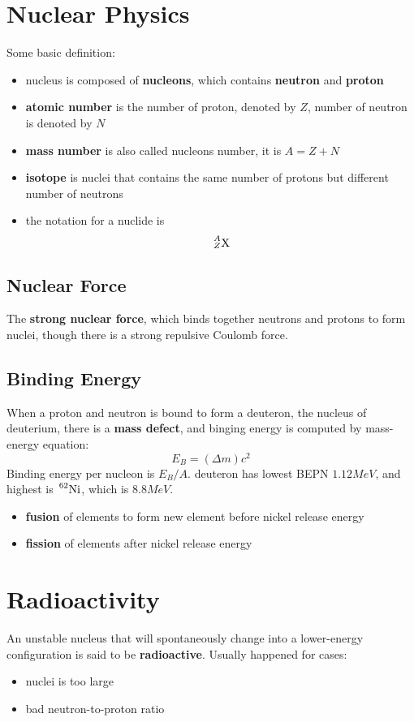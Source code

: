 \documentclass[10pt,a4paper,oneside]{article}
\begin{document}
\section{Nuclear Physics}
Some basic definition:
\begin{itemize}
	\item nucleus is composed of \textbf{nucleons}, which contains \textbf{neutron} and \textbf{proton}
	\item \textbf{atomic number} is the number of proton, denoted by $Z$, number of neutron is denoted by $N$
	\item \textbf{mass number} is also called nucleons number, it is $A=Z+N$
	\item \textbf{isotope} is nuclei that contains the same number of protons but different number of neutrons
	\item the notation for a nuclide is
	\[
	\sideset{^A_Z}{}{\mathop{\mathrm{X}}}
	\]
\end{itemize}

\subsection{Nuclear Force}
The \textbf{strong nuclear force}, which binds together neutrons and protons to form nuclei, though there is a strong repulsive Coulomb force.

\subsection{Binding Energy}
When a proton and neutron is bound to form a deuteron, the nucleus of deuterium, there is a \textbf{mass defect}, and binging energy is computed by mass-energy equation:
\[
E_B = (\Delta m) c^2
\]
Binding energy per nucleon is $E_B/A$. deuteron has lowest BEPN $1.12 MeV$, and highest is $\sideset{^{62}}{}{\mathop{\mathrm{Ni}}}$, which is $8.8MeV$.
\begin{itemize}
	\item \textbf{fusion} of elements to form new element before nickel release energy
	\item \textbf{fission} of elements after nickel release energy
\end{itemize}

\section{Radioactivity}
An unstable nucleus that will spontaneously change into a lower-energy configuration is said to be \textbf{radioactive}. Usually happened for cases:
\begin{itemize}
	\item nuclei is too large
	\item bad neutron-to-proton ratio
\end{itemize}
\end{document}
